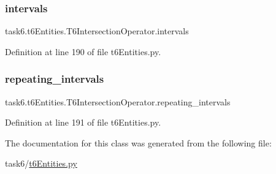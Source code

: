 \subsubsection{\texorpdfstring{intervals}{intervals}}
{\footnotesize\ttfamily task6.\+t6\+Entities.\+T6\+Intersection\+Operator.\+intervals}



Definition at line 190 of file t6\+Entities.\+py.

\mbox{\label{classtask6_1_1t6Entities_1_1T6IntersectionOperator_ad8792e2967320f1650f5f51ea1d416f3}} 
\subsubsection{\texorpdfstring{repeating\+\_\+intervals}{repeating\_intervals}}
{\footnotesize\ttfamily task6.\+t6\+Entities.\+T6\+Intersection\+Operator.\+repeating\+\_\+intervals}



Definition at line 191 of file t6\+Entities.\+py.



The documentation for this class was generated from the following file\+:\begin{DoxyCompactItemize}
\item 
task6/\hyperlink{t6Entities_8py}{t6\+Entities.\+py}\end{DoxyCompactItemize}
